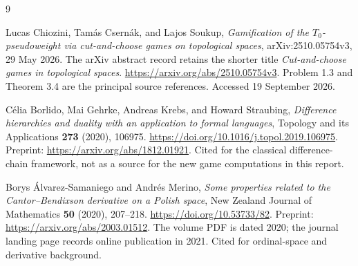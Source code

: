 \documentclass[11pt,letterpaper]{article}
\numberwithin{equation}{section}
\theoremstyle{definition}
\theoremstyle{remark}
\begin{document}
\begin{thebibliography}{9}
\small
\setlength{\itemsep}{0.35em}
\setlength{\parskip}{0pt}

Lucas Chiozini, Tam\'as Csern\'ak, and Lajos Soukup,
\emph{Gamification of the $T_0$-pseudoweight via cut-and-choose games on
topological spaces}, arXiv:2510.05754v3, 29 May 2026.
The arXiv abstract record retains the shorter title
\emph{Cut-and-choose games in topological spaces}.
\url{https://arxiv.org/abs/2510.05754v3}.
Problem 1.3 and Theorem 3.4 are the principal source references.
Accessed 19 September 2026.

C\'elia Borlido, Mai Gehrke, Andreas Krebs, and Howard Straubing,
\emph{Difference hierarchies and duality with an application to formal languages},
Topology and its Applications \textbf{273} (2020), 106975.
\url{https://doi.org/10.1016/j.topol.2019.106975}.
Preprint: \url{https://arxiv.org/abs/1812.01921}.
Cited for the classical difference-chain framework, not as a source for the
new game computations in this report.

Borys \'Alvarez-Samaniego and Andr\'es Merino,
\emph{Some properties related to the Cantor--Bendixson derivative on a Polish space},
New Zealand Journal of Mathematics \textbf{50} (2020), 207--218.
\url{https://doi.org/10.53733/82}.
Preprint: \url{https://arxiv.org/abs/2003.01512}.
The volume PDF is dated 2020; the journal landing page records online
publication in 2021. Cited for ordinal-space and derivative background.

\end{thebibliography}
\end{document}
